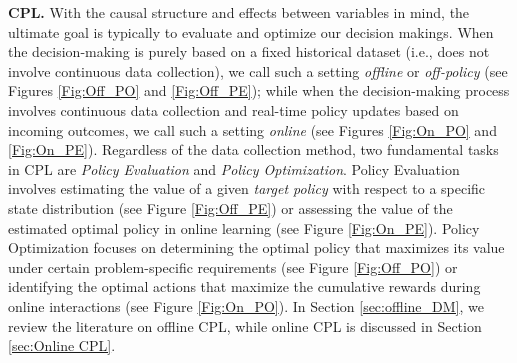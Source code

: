 \textbf{\acrlong{CPL}.} 
With the causal structure and effects between variables in mind, the ultimate goal is typically to evaluate and optimize our decision makings. 
When the decision-making is purely based on a fixed historical dataset (i.e., does not involve continuous data collection), we call such a setting \textit{offline} or \textit{off-policy} (see Figures \ref{Fig:Off_PO} 
and \ref{Fig:Off_PE}); 
while when the decision-making process involves continuous data collection and real-time policy updates based on incoming outcomes, we call such a setting \textit{online} (see Figures \ref{Fig:On_PO} 
and \ref{Fig:On_PE}). 
Regardless of the data collection method, two fundamental tasks in \acrshort{CPL} are 
\textit{Policy Evaluation} and \textit{Policy Optimization}. Policy Evaluation \citep{voloshin2019empirical, uehara2022review, ye2023doubly} involves estimating the value of a given \textit{target policy} with respect to a specific state distribution (see Figure \ref{Fig:Off_PE}) or assessing the value of the estimated optimal policy in online learning (see Figure \ref{Fig:On_PE}). Policy Optimization 
\citep{prudencio2023survey, Sergey2020offlineRL, liu2021map,bouneffouf2020survey,silva2022multi,zhou2015survey, shakya2023reinforcement,ladosz2022exploration,wang2022deep,moerland2023model}
focuses on determining the optimal policy that maximizes its value under certain problem-specific requirements (see Figure \ref{Fig:Off_PO}) or identifying the optimal actions that maximize the cumulative rewards during online interactions (see Figure \ref{Fig:On_PO}). In Section \ref{sec:offline_DM}, we review the literature on offline \acrshort{CPL}, while online \acrshort{CPL} is discussed in Section \ref{sec:Online CPL}.






